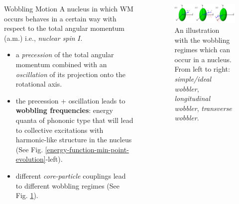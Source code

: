 \documentclass[final]{beamer}
\newlength{\sepwidth}
\newlength{\colwidth}
\newcommand{\separatorcolumn}{\begin{column}{\sepwidth}\end{column}}
\begin{document}
\begin{frame}[t]
\begin{columns}[t]
\begin{column}{\colwidth}
\begin{block}{Wobbling Motion}
  A nucleus in which WM occurs behaves in a certain way with respect to the total angular momentum (a.m.) i.e., \emph{nuclear spin} $I$.
  \begin{itemize}
    \item a \emph{precession} of the total angular momentum combined with an \emph{oscillation} of its projection onto the rotational axis.
    \item the precession + oscillation leads to \textbf{wobbling frequencies}: energy quanta of phononic type that will lead to collective excitations with harmonic-like structure in the nucleus  (See Fig. \ref{energy-function-min-point-evolution}-left).
    \item different \emph{core-particle} couplings lead to different wobbling regimes (See Fig. \ref{wobbling-regimes}).
\end{itemize}
 
 
\end{block}
\end{column}

\separatorcolumn

\begin{column}{\colwidth}


\begin{figure}
      \centering
      \includegraphics[scale=1.7]{images/wobbling_Regimes_COUPLING_SCHEME.pdf}
      \caption{An illustration with the wobbling regimes which can occur in a nucleus. From left to right: \emph{simple/ideal wobbler}, \emph{longitudinal wobbler}, \emph{transverse wobbler}.}
      \label{wobbling-regimes}
  \end{figure}


\end{column}
\end{columns}
\end{frame}
\end{document}
